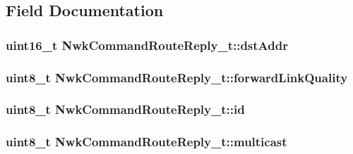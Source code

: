 \subsection{Field Documentation}
\hypertarget{struct_nwk_command_route_reply__t_a278ee8f3e8101e8f8c012986085d96b9}{
\subsubsection[{dst\-Addr}]{\setlength{\rightskip}{0pt plus 5cm}uint16\-\_\-t Nwk\-Command\-Route\-Reply\-\_\-t\-::dst\-Addr}}\label{struct_nwk_command_route_reply__t_a278ee8f3e8101e8f8c012986085d96b9}
\hypertarget{struct_nwk_command_route_reply__t_a97749919a31cea60151be87f82784298}{
\subsubsection[{forward\-Link\-Quality}]{\setlength{\rightskip}{0pt plus 5cm}uint8\-\_\-t Nwk\-Command\-Route\-Reply\-\_\-t\-::forward\-Link\-Quality}}\label{struct_nwk_command_route_reply__t_a97749919a31cea60151be87f82784298}
\hypertarget{struct_nwk_command_route_reply__t_a5a5dd0d65c52573b45b5f64fd2833d66}{
\subsubsection[{id}]{\setlength{\rightskip}{0pt plus 5cm}uint8\-\_\-t Nwk\-Command\-Route\-Reply\-\_\-t\-::id}}\label{struct_nwk_command_route_reply__t_a5a5dd0d65c52573b45b5f64fd2833d66}
\hypertarget{struct_nwk_command_route_reply__t_a4dd17fd5afe5333f85ab6b061be7116f}{
\subsubsection[{multicast}]{\setlength{\rightskip}{0pt plus 5cm}uint8\-\_\-t Nwk\-Command\-Route\-Reply\-\_\-t\-::multicast}}\label{struct_nwk_command_route_reply__t_a4dd17fd5afe5333f85ab6b061be7116f}
